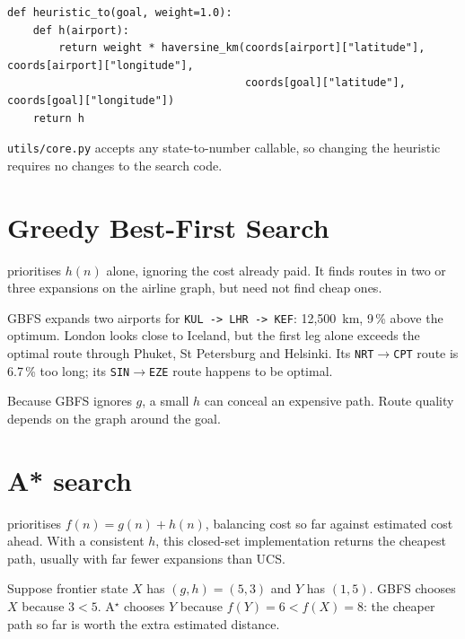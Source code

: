 \begin{lstlisting}[style=aipython]
def heuristic_to(goal, weight=1.0):
    def h(airport):
        return weight * haversine_km(coords[airport]["latitude"], coords[airport]["longitude"],
                                     coords[goal]["latitude"], coords[goal]["longitude"])
    return h
\end{lstlisting}

\texttt{utils/core.py} accepts any state-to-number callable, so changing the heuristic requires no changes to the search code.

\section{Greedy Best-First Search}

 prioritises $h(n)$ alone, ignoring the cost already paid. It finds routes in two or three expansions on the airline graph, but need not find cheap ones.

\begin{workedexample}
GBFS expands two airports for \texttt{KUL -> LHR -> KEF}: 12,500~km, 9\,\% above the optimum. London looks close to Iceland, but the first leg alone exceeds the optimal route through Phuket, St Petersburg and Helsinki. Its \texttt{NRT}$\to$\texttt{CPT} route is 6.7\,\% too long; its \texttt{SIN}$\to$\texttt{EZE} route happens to be optimal.
\end{workedexample}

\begin{pitfall}
Because GBFS ignores $g$, a small $h$ can conceal an expensive path. Route quality depends on the graph around the goal.
\end{pitfall}

\section{A* search}

 prioritises $f(n)=g(n)+h(n)$, balancing cost so far against estimated cost ahead. With a consistent $h$, this closed-set implementation returns the cheapest path, usually with far fewer expansions than UCS.

\begin{workedexample}
Suppose frontier state $X$ has $(g,h)=(5,3)$ and $Y$ has $(1,5)$. GBFS chooses $X$ because $3<5$. A$^\star$ chooses $Y$ because $f(Y)=6<f(X)=8$: the cheaper path so far is worth the extra estimated distance.
\end{workedexample}

